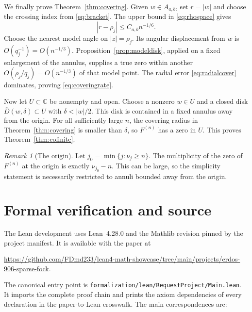 \documentclass[11pt,reqno]{amsart}
\numberwithin{equation}{section}
\theoremstyle{remark}
\newtheorem{remark}[theorem]{Remark}
\newcommand{\C}{\mathbb C}
\newcommand{\Aab}{A_{a,b}}
\begin{document}
We finally prove Theorem~\ref{thm:covering}.  Given $w\in\Aab$, set $r=|w|$ and choose the crossing index from \eqref{eq:bracket}.  The upper bound in \eqref{eq:rhospace} gives
\begin{equation}\label{eq:radialcover}
 |r-\rho_j|\le C_{a,b}n^{-1/6}.
\end{equation}
Choose the nearest model angle on $|z|=\rho_j$.  Its angular displacement from $w$ is $O(q_j^{-1})=O(n^{-1/3})$.  Proposition~\ref{prop:modeldisk}, applied on a fixed enlargement of the annulus, supplies a true zero within another $O(\rho_j/q_j)=O(n^{-1/3})$ of that model point.  The radial error \eqref{eq:radialcover} dominates, proving \eqref{eq:coveringrate}.

Now let $U\subset\C$ be nonempty and open.  Choose a nonzero $w\in U$ and a closed disk $\overline D(w,\delta)\subset U$ with $\delta<|w|/2$.  This disk is contained in a fixed annulus away from the origin.  For all sufficiently large $n$, the covering radius in Theorem~\ref{thm:covering} is smaller than $\delta$, so $F^{(n)}$ has a zero in $U$.  This proves Theorem~\ref{thm:cofinite}.

\begin{remark}[The origin]\label{rem:origin}
Let $j_0=\min\{j:\nu_j\ge n\}$.  The multiplicity of the zero of $F^{(n)}$ at the origin is exactly $\nu_{j_0}-n$.  This can be large, so the simplicity statement is necessarily restricted to annuli bounded away from the origin.
\end{remark}

\section{Formal verification and source}\label{sec:formal}

The Lean development uses Lean~4.28.0 and the Mathlib revision pinned by the project manifest.  It is available with the paper at
\begin{center}
\url{https://github.com/FDmd233/lean4-math-showcase/tree/main/projects/erdos-906-sparse-fock}.
\end{center}
The canonical entry point is \texttt{formalization/lean/RequestProject/Main.lean}.  It imports the complete proof chain and prints the axiom dependencies of every declaration in the paper-to-Lean crosswalk.  The main correspondences are:
\end{document}
